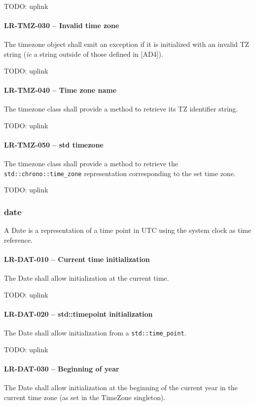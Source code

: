 TODO: uplink
\paragraph{LR-TMZ-030 -- Invalid time zone}
The timezone object shall emit an exception if it is initialized with
an invalid TZ string (\textit{ie} a string outside of those defined in [AD4]).

TODO: uplink
\paragraph{LR-TMZ-040 -- Time zone name}
The timezone class shall provide a method to retrieve its TZ identifier string.

TODO: uplink

\paragraph{LR-TMZ-050 -- std time\textunderscore zone}
The timezone class shall provide a method to retrieve the
\lstinline{std::chrono::time_zone} representation corresponding to the set
time zone.

TODO: uplink

\subsubsection{date}
A Date is a representation of a time point in UTC using the system clock
as time reference.

\paragraph{LR-DAT-010 -- Current time initialization}
The Date shall allow initialization at the current time.

TODO: uplink

\paragraph{LR-DAT-020 -- std::time\textunderscore point initialization}
The Date shall allow initialization from a \lstinline{std::time_point}.

TODO: uplink

\paragraph{LR-DAT-030 -- Beginning of year}
The Date shall allow initialization at the beginning of the current year
in the current time zone (as set in the TimeZone singleton).

